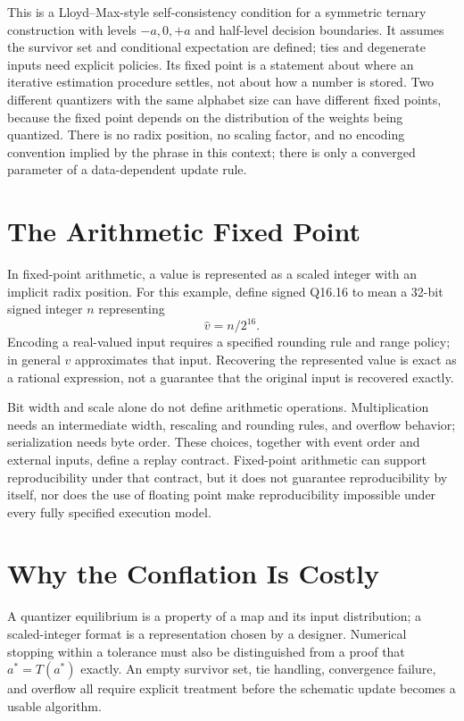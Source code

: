 \documentclass[11pt]{article}
\begin{document}
This is a Lloyd--Max-style self-consistency condition for a symmetric ternary construction with levels $-a,0,+a$ and half-level decision boundaries. It assumes the survivor set and conditional expectation are defined; ties and degenerate inputs need explicit policies. Its fixed point is a statement about where an iterative estimation procedure settles, not about how a number is stored. Two different quantizers with the same alphabet size can have different fixed points, because the fixed point depends on the distribution of the weights being quantized. There is no radix position, no scaling factor, and no encoding convention implied by the phrase in this context; there is only a converged parameter of a data-dependent update rule.

\section{The Arithmetic Fixed Point}

In fixed-point arithmetic, a value is represented as a scaled integer with an implicit radix position. For this example, define signed Q16.16 to mean a 32-bit signed integer $n$ representing
\[
\widehat v=n/2^{16}.
\]
Encoding a real-valued input requires a specified rounding rule and range policy; in general $\widehat v$ approximates that input. Recovering the represented value is exact as a rational expression, not a guarantee that the original input is recovered exactly.

Bit width and scale alone do not define arithmetic operations. Multiplication needs an intermediate width, rescaling and rounding rules, and overflow behavior; serialization needs byte order. These choices, together with event order and external inputs, define a replay contract. Fixed-point arithmetic can support reproducibility under that contract, but it does not guarantee reproducibility by itself, nor does the use of floating point make reproducibility impossible under every fully specified execution model.

\section{Why the Conflation Is Costly}

A quantizer equilibrium is a property of a map and its input distribution; a scaled-integer format is a representation chosen by a designer. Numerical stopping within a tolerance must also be distinguished from a proof that $a^*=T(a^*)$ exactly. An empty survivor set, tie handling, convergence failure, and overflow all require explicit treatment before the schematic update becomes a usable algorithm.
\end{document}
